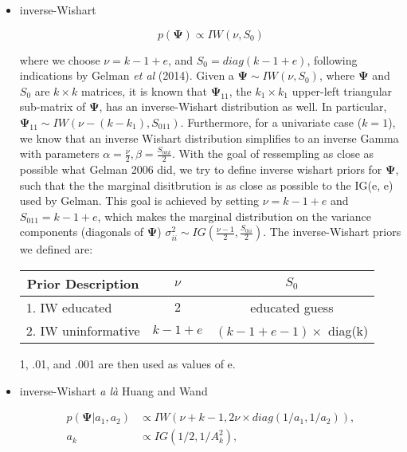 \documentclass[a4paper]{article}
\begin{document}
\begin{itemize}
	\item inverse-Wishart
	
\begin{equation}
p(\bm{\Psi}) \propto IW(\nu, S_{0})
\end{equation}	

where we choose $\nu = k-1+e$, and $S_{0}=diag(k-1+e)$, following indications by Gelman \textit{et al} (2014). Given a $\bm{\Psi} \sim IW(\nu, S_{0})$, where $\bm{\Psi}$ and $S_{0}$ are $k \times k$ matrices, it is known that $\bm{\Psi}_{11}$, the $k_1 \times k_1$ upper-left triangular sub-matrix of $\bm{\Psi}$, has an inverse-Wishart distribution as well. In particular, $\bm{\Psi}_{11} \sim IW(\nu-(k-k_1), S_{011})$. Furthermore, for a univariate case ($k=1$), we know that an inverse Wishart distribution simplifies to an inverse Gamma with parameters $\alpha=\frac{\nu}{2}, \beta = \frac{S_{0kk}}{2}$. With the goal of ressempling as close as possible what Gelman 2006 did, we try to define inverse wishart priors for $\bm{\Psi}$, such that the the marginal disitbrution is as close as possible to the IG(e, e) used by Gelman. This goal is achieved by setting $\nu = k-1+e$ and $S_{011} = k-1+e$, which makes the marginal distribution on the variance components (diagonals of $\bm{\Psi}$) $\sigma_{ii}^{2} \sim IG(\frac{\nu-1}{2},\frac{S_{0ii}}{2})$. The inverse-Wishart priors we defined are:
\begin{center}
\begin{tabular}{ c c c }
 Prior Description & $\nu$ & $S_{0}$ \\ 
 \hline
 \multicolumn{1}{l}{1. IW educated} & $2$ & educated guess \\
 \multicolumn{1}{l}{2. IW uninformative} & $k-1+e$ & $(k-1+e-1)\times$ diag(k) \\  
 \hline
\end{tabular}
\end{center}
1, .01, and .001 are then used as values of e.

	\item inverse-Wishart \textit{a là} Huang and Wand

\begin{equation}
	\begin{split}
	p(\bm{\Psi}|a_1, a_2)& \propto IW(\nu + k - 1, 2\nu \times diag(1/a_1, 1/a_2)), \\
	a_k& \propto IG(1/2,1/A_k^2),
	\end{split}
\end{equation}


\end{itemize}
\end{document}
